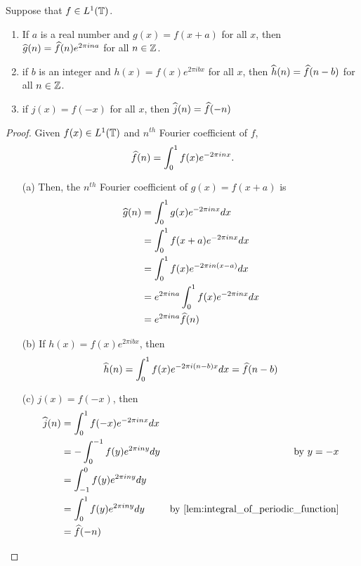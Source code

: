   \begin{proposition}
    \label{prop:properties_of_fourier_coefficients}
    Suppose that $f\in L^1(\mathbb T)$.
    \begin{enumerate}[label=(\alph*)]
      \item If $a$ is a real number and $g(x) = f(x+a)$ for all $x$, then $\widehat{g}(n) = \widehat{f}(n)e^{2\pi ina}$ for all $n \in \mathbb Z$.
      \item if $b$ is an integer and $h(x) = f(x)e^{2\pi i bx}$ for all $x$, then $\widehat{h}(n) = \widehat{f}(n-b)$ for all $n\in \mathbb Z$.
      \item if $j(x) = f(-x)$ for all $x$, then $\widehat{j}(n) = \widehat{f}(-n)$
    \end{enumerate}
  \end{proposition}
  \begin{proof}
     Given $f(x) \in L^1(\mathbb T)$ and $n^{th}$ Fourier coefficient of $f$,  
    \[\widehat{f}(n) = \int_{0}^{1}f(x)e^{-2 \pi inx}.\]
    \begin{enumerate}
      \item[(a)] Then, the $n^{th}$ Fourier coefficient of $g(x) = f(x+a)$ is
        \begin{align*}
          \widehat{g}(n) &= \int_{0}^{1}g(x)e^{-2\pi inx} dx \\
                &= \int_{0}^{1}f(x+a)e^{-2\pi inx} dx \\
                &= \int_{0}^{1}f(x)e^{-2\pi in(x-a)} dx \\
                &= e^{2\pi ina} \int_0^1 f(x)e^{-2\pi inx} dx \\
                &= e^{2\pi ina} \widehat{f}(n)
        \end{align*}

      \item[(b)] If $h(x) = f(x)e^{2\pi ibx}$, then
        \begin{displaymath}
          \widehat{h}(n) = \int_0^1 f(x)e^{-2 \pi i (n-b)x} dx = \widehat{f}(n-b)
        \end{displaymath}
      \item[(c)] $j(x) = f(-x)$, then
        \begin{align*}
          \hatj(n)  &= \int_0^1 f(-x)e^{-2\pi inx} dx \\
                    &= -\int_0^{-1} f(y) e^{2\pi iny}dy & \text{by } y=-x\\
                    &= \int_{-1}^0 f(y)e^{2\pi iny}dy \\
                    &= \int_0^1 f(y)e^{2\pi iny}dy & \text{by \autoref{lem:integral_of_periodic_function}}\\
                    &= \hatf(-n)
        \end{align*}
        
        
    \end{enumerate}
  \end{proof}


